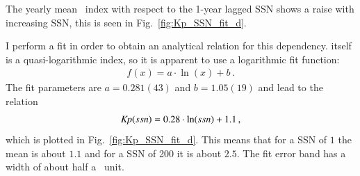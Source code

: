 The yearly mean \Kp~index with respect to the 1-year lagged SSN shows a raise with increasing SSN, this is seen in Fig.~\ref{fig:Kp_SSN_fit_d}.
\begin{figure}
\end{figure}
I perform a fit in order to obtain an analytical relation for this dependency. \Kp{} itself is a quasi-logarithmic index, so it is apparent to use a logarithmic fit function:
\begin{align}
	f(x) = a \cdot \ln(x) + b	\,.	\label{eq:log_fit_function}
\end{align}
The fit parameters are $a = 0.281(43)$ and $b = 1.05(19)$ and lead to the relation
\begin{align}
	\textit{Kp}(ssn) = 0.28 \cdot \ln(ssn) + 1.1	\,,	\label{eq:kp_ssn_relation}
\end{align}
which is plotted in Fig.~\ref{fig:Kp_SSN_fit_d}. This means that for a SSN of $1$ the mean \Kp{} is about $1.1$ and for a SSN of 200 it is about $2.5$. The fit error band has a width of about half a \Kp~unit.

